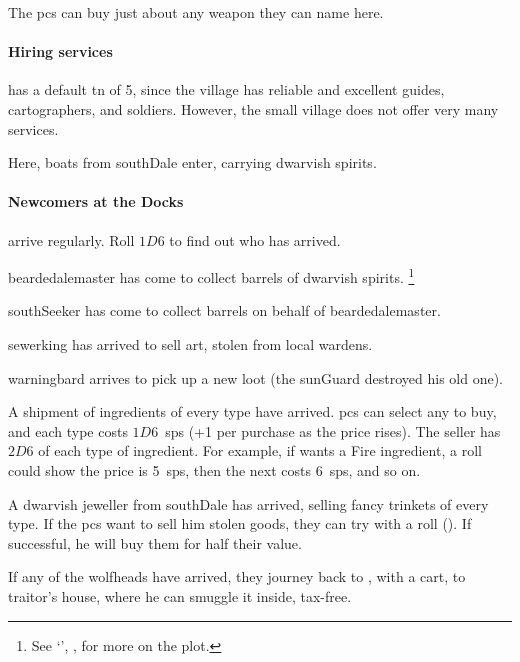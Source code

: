 \begin{multicols}{2}
The \glspl{pc} can buy just about any weapon they can name here.

\paragraph{Hiring services}
has a default \gls{tn} of 5, since the \gls{village} has reliable and excellent guides, cartographers, and soldiers.
However, the small \gls{village} does not offer very many services.


Here, boats from \gls{southDale} enter, carrying dwarvish spirits.

\paragraph{Newcomers at the Docks}
arrive regularly.
Roll $1D6$ to find out who has arrived.

\begin{dlist}
  \item
  \Gls{beardedalemaster} has come to collect barrels of dwarvish spirits.%
  \footnote{See `', , for more on the plot.}
  \item
  \Gls{southSeeker} has come to collect barrels on behalf of \gls{beardedalemaster}.
  \item
  \Gls{sewerking} has arrived to sell art, stolen from local \glspl{warden}.
  \item
  \Gls{warningbard} arrives to pick up a new loot (the \gls{sunGuard} destroyed his old one).
  \item
  A shipment of \glspl{ingredient} of every type have arrived.
  \Glspl{pc} can select any to buy, and each type costs $1D6$~\glspl{sp} (+1 per purchase as the price rises).
  The seller has $2D6$ of each type of \gls{ingredient}.
  For example, if  wants a Fire \gls{ingredient}, a roll could show the price is 5~\glspl{sp}, then the next costs 6~\glspl{sp}, and so on.
  \item
  A dwarvish jeweller from \gls{southDale} has arrived, selling fancy trinkets of every type.
  If the \glspl{pc} want to sell him stolen goods, they can try with a  roll (\tn[12]).
  If successful, he will buy them for half their value.
\end{dlist}

If any of the \glspl{wolfhead} have arrived, they journey back to , with a cart, to \gls{traitor}'s house, where he can smuggle it inside, tax-free.

\end{multicols}

